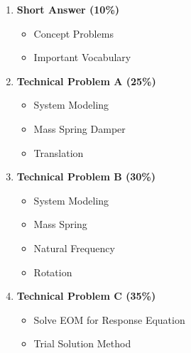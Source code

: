 \documentclass[11pt]{article}
\begin{document}
\begin{itemize}
\begin{enumerate}
		\item  \textbf{\Large Short Answer (10\%)} \\
		\begin{itemize}
			\item Concept Problems
			\item Important Vocabulary \\
		\end{itemize}
		\item  \textbf{\Large Technical Problem A (25\%)}\\
		\begin{itemize}
			\item System Modeling
			\item Mass Spring Damper
			\item Translation \\
		\end{itemize}
		\item  \textbf{\Large Technical Problem B (30\%)}\\
		\begin{itemize}
			\item System Modeling
			\item Mass Spring
			\item Natural Frequency	
			\item Rotation \\
		\end{itemize}
		\item  \textbf{\Large Technical Problem C (35\%)}\\
\begin{itemize}
			\item Solve EOM for Response Equation
			\item Trial Solution Method\\
\end{itemize}
	\end{enumerate}


\end{itemize}


	
\end{document}
